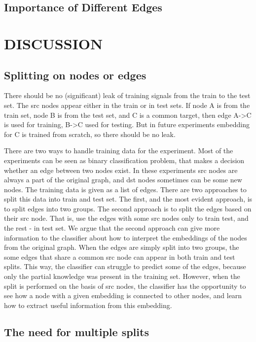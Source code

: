 \documentclass[a4paper,twoside]{article}
\begin{document}
\subsection{Importance of Different Edges}


\section{\uppercase{Discussion}}

\subsection{Splitting on nodes or edges}

There should be no (significant) leak of training signals from the train to the test set. The src nodes appear either in the train or in test sets. If node A is from the train set, node B is from the test set, and C is a common target, then edge A->C is used for training, B->C used for testing. But in future experiments embedding for C is trained from scratch, so there should be no leak.

There are two ways to handle training data for the experiment. Most of the experiments can be seen as binary classification problem, that makes a decision whether an edge between two nodes exist. In these experiments src nodes are always a part of the original graph, and dst nodes sometimes can be some new nodes. The training data is given as a list of edges. There are two approaches to split this data into train and test set. The first, and the most evident approach, is to split edges into two groups. The second approach is to split the edges based on their src node. That is, use the edges with some src nodes only to train test, and the rest - in test set. 
We argue that the second approach can give more information to the classifier about how to interpret the embeddings of the nodes from the original graph. When the edges are simply split into two groups, the some edges that share a common src node can appear in both train and test splits. This way, the classifier can struggle to predict some of the edges, because only the partial knowledge was present in the training set. However, when the split is performed on the basis of src nodes, the classifier has the opportunity to see how a node with a given embedding is connected to other nodes, and learn how to extract useful information from this embedding. 

\subsection{The need for multiple splits}
\end{document}
